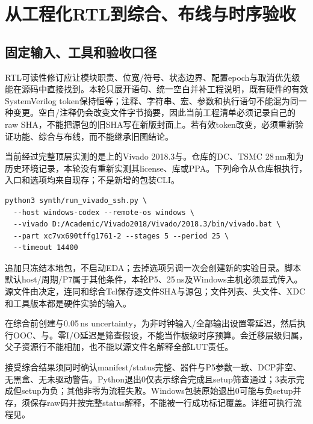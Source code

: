 \chapter{从工程化RTL到综合、布线与时序验收}
\label{chap:engineering-sta}
\section{固定输入、工具和验收口径}
RTL可读性修订应让模块职责、位宽/符号、状态边界、配置epoch与取消优先级能在源码中直接找到。本轮只展开语句、统一空白并补工程说明，既有硬件的有效SystemVerilog token保持恒等；注释、字符串、宏、参数和执行语句不能混为同一种变更。空白/注释仍会改变文件字节摘要，因此当前工程清单必须记录自己的raw SHA，不能把源包的旧SHA写在新版封面上。若有效token改变，必须重新验证功能、综合与布线，而不能继承旧图结论。

当前经过完整顶层实测的是上的Vivado 2018.3与。仓库的DC、TSMC 28\,nm和为历史环境记录，本轮没有重新实测其license、库或PPA。下列命令从仓库根执行，入口和选项均来自现存；不是新增的包装CLI。
\begingroup\footnotesize
\begin{verbatim}
python3 synth/run_vivado_ssh.py \
  --host windows-codex --remote-os windows \
  --vivado D:/Academic/Vivado2018/Vivado/2018.3/bin/vivado.bat \
  --part xc7vx690tffg1761-2 --stages 5 --period 25 \
  --timeout 14400
\end{verbatim}
\endgroup
追加\code{--prepare-only}只冻结本地包，不启动EDA；去掉选项另调一次会创建新的实验目录。脚本默认host/周期/P7属于其他条件，本轮P5、25\,ns及Windows主机必须显式传入。源文件由决定，连同和综合Tcl保存逐文件SHA与源包；文件列表、头文件、XDC和工具版本都是硬件实验的输入。

在综合前创建与0.05\,ns uncertainty，为非时钟输入/全部输出设置零延迟，然后执行OOC、与。零I/O延迟是筛查假设，不能当作板级时序预算。会迁移层级归属，父子资源行不能相加，也不能以源文件名解释全部LUT责任。

接受综合结果须同时确认manifest/status完整、器件与P5参数一致、DCP非空、无黑盒、无\code{Synth 8-3848}未驱动警告。Python退出0仅表示综合完成且setup筛查通过；3表示完成但setup为负；其他非零为流程失败。Windows包装原始退出0可能与负setup并存，须保存raw码并按完整status解释，不能被一行成功标记覆盖。详细可执行流程见。

